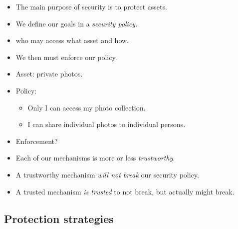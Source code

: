 \begin{frame}
  \begin{itemize}
    \item The main purpose of security is to protect assets.

      \pause

    \item We define our goals in a \emph{security policy}.
    \item \Eg who may access what asset and how.

      \pause

    \item We then must enforce our policy.
  \end{itemize}
\end{frame}

\begin{frame}
  \begin{example}
    \begin{itemize}
      \item Asset: private photos.

      \item Policy:
        \begin{itemize}
          \item Only I can access my photo collection.
          \item I can share individual photos to individual persons.
        \end{itemize}

        \pause

      \item Enforcement?
    \end{itemize}
  \end{example}
\end{frame}

\begin{frame}
  \begin{itemize}
    \item Each of our mechanisms is more or less \emph{trustworthy}.
    \item A trustworthy mechanism \emph{will not break} our security policy.
    \item A trusted mechanism \emph{is trusted} to not break, but actually 
      might break.
  \end{itemize}
\end{frame}

\subsection{Protection strategies}

